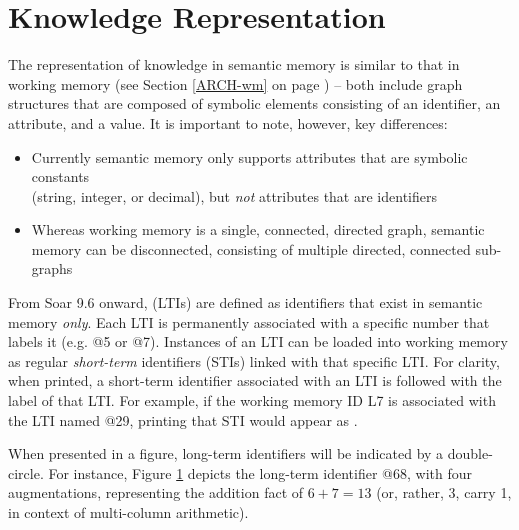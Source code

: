\section{Knowledge Representation}
\label{SMEM-kr}

The representation of knowledge in semantic memory is similar to that in working memory (see Section \ref{ARCH-wm} on page \pageref{ARCH-wm}) -- both include graph structures that are composed of symbolic elements consisting of an identifier, an attribute, and a value. 
It is important to note, however, key differences:

\begin{itemize}

\item 
Currently semantic memory only supports attributes that are symbolic constants \\
(string, integer, or decimal), but \emph{not} attributes that are identifiers

\item 
Whereas working memory is a single, connected, directed graph, semantic memory can be disconnected, consisting of multiple directed, connected sub-graphs

\end{itemize}

From Soar 9.6 onward,   (LTIs) are defined as identifiers that exist in semantic memory \emph{only}.
Each LTI is permanently associated with a specific number that labels it (e.g. {@}5 or {@}7).
Instances of an LTI can be loaded into working memory as regular \emph{short-term} identifiers (STIs) linked with that specific LTI.
For clarity, when printed, a short-term identifier associated with an LTI is followed with the label of that LTI.
For example, if the working memory ID L7 is associated with the LTI named {@}29, printing that STI would appear as . 

When presented in a figure, long-term identifiers will be indicated by a double-circle. 
For instance, Figure \ref{fig:smem-concept} depicts the long-term identifier {@}68, with four augmentations, representing the addition fact of ${6+7=13}$ (or, rather, 3, carry 1, in context of multi-column arithmetic).

\begin{figure}
\label{fig:smem-concept}
\end{figure}

